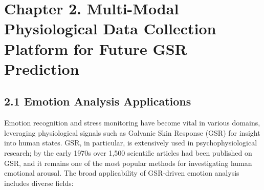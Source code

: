 \label{chap:2}

\chapter{Chapter 2. Multi-Modal Physiological Data Collection Platform for Future GSR Prediction}

\section{2.1 Emotion Analysis Applications}

Emotion recognition and stress monitoring have become vital in various
domains, leveraging physiological signals such as Galvanic Skin Response
(GSR) for insight into human states. GSR, in particular, is extensively
used in psychophysiological research; by the early 1970s over 1,500
scientific articles had been published on GSR, and it remains one of the
most popular methods for investigating human emotional
arousal\cite{Boucsein2012}.
The broad applicability of GSR-driven emotion analysis includes diverse
fields:

